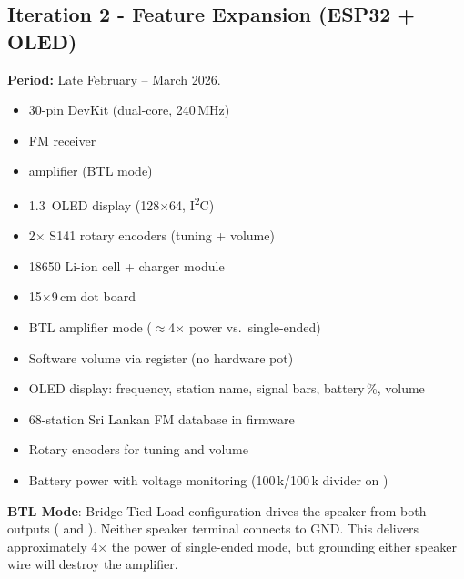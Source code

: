 \subsection{Iteration 2 - Feature Expansion (ESP32 + OLED)}

\textbf{Period:} Late February – March 2026.

\medskip\noindent
{}

\begin{itemize}[nosep]
    \item {} 30-pin DevKit (dual-core, 240\,MHz)
    \item {} FM receiver
    \item {} amplifier (BTL mode)
    \item {} 1.3\textquotedbl{}\ OLED display (128$\times$64, I\textsuperscript{2}C)
    \item 2$\times$ S141 rotary encoders (tuning + volume)
    \item 18650 Li-ion cell +  charger module
    \item 15$\times$9\,cm dot board
\end{itemize}

\medskip\noindent
{}

\begin{itemize}[nosep]
    \item BTL amplifier mode ($\approx$4$\times$ power vs.\ single-ended)
    \item Software volume via  register (no hardware pot)
    \item OLED display: frequency, station name, signal bars, battery\,\%, volume
    \item 68-station Sri Lankan FM database in firmware
    \item Rotary encoders for tuning and volume
    \item Battery power with voltage monitoring (100\,k/100\,k divider on )
\end{itemize}

\begin{calloutdecision}
\textbf{BTL Mode}: Bridge-Tied Load configuration drives the speaker from
both  outputs ( and ).  Neither
speaker terminal connects to GND\@.  This delivers approximately 4$\times$
the power of single-ended mode, but grounding either speaker wire will
destroy the amplifier.
\end{calloutdecision}

